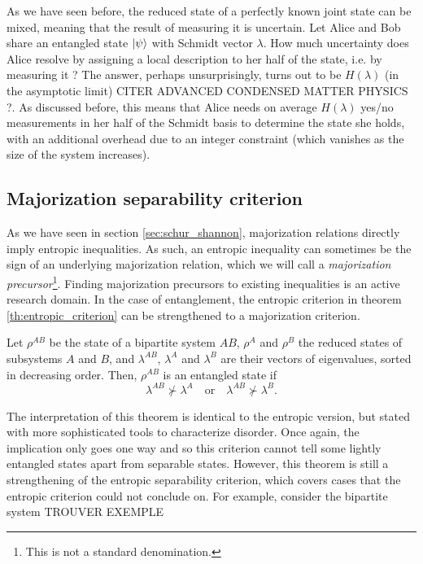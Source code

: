 As we have seen before, the reduced state of a perfectly known joint state can be mixed, meaning that the result of measuring it is uncertain. Let Alice and Bob share an entangled state $\ket{\psi}$ with Schmidt vector $\lambda$. How much uncertainty does Alice resolve by assigning a local description to her half of the state, i.e. by measuring it ? The answer, perhaps unsurprisingly, turns out to be $H(\lambda)$ (in the asymptotic limit) CITER ADVANCED CONDENSED MATTER PHYSICS ?. As discussed before, this means that Alice needs on average $H(\lambda)$ yes/no measurements in her half of the Schmidt basis to determine the state she holds, with an additional overhead due to an integer constraint (which vanishes as the size of the system increases).



\subsection{Majorization separability criterion} \label{sec:majorization_separability_criterion}

As we have seen in section \ref{sec:schur_shannon}, majorization relations directly imply entropic inequalities. As such, an entropic inequality can sometimes be the sign of an underlying majorization relation, which we will call a \textit{majorization precursor}\footnote{This is not a standard denomination.}. Finding majorization precursors to existing inequalities is an active research domain. In the case of entanglement, the entropic criterion in theorem \ref{th:entropic_criterion} can be strengthened to a majorization criterion.

\begin{theorem} \label{th:majorization_separability_criterion}
    Let $\rho^{AB}$ be the state of a bipartite system $AB$, $\rho^A$ and $\rho^B$ the reduced states of subsystems $A$ and $B$, and $\lambda^{AB}$, $\lambda^A$ and $\lambda^B$ are their vectors of eigenvalues, sorted in decreasing order. Then, $\rho^{AB}$ is an entangled state if 
    \begin{equation}
        \lambda^{AB} \nsucc \lambda^A \quad \text{or} \quad \lambda^{AB} \nsucc \lambda^B.
    \end{equation}
\end{theorem}

The interpretation of this theorem is identical to the entropic version, but stated with more sophisticated tools to characterize disorder. Once again, the implication only goes one way and so this criterion cannot tell some lightly entangled states apart from separable states. However, this theorem is still a strengthening of the entropic separability criterion, which covers cases that the entropic criterion could not conclude on. For example, consider the bipartite system TROUVER EXEMPLE

